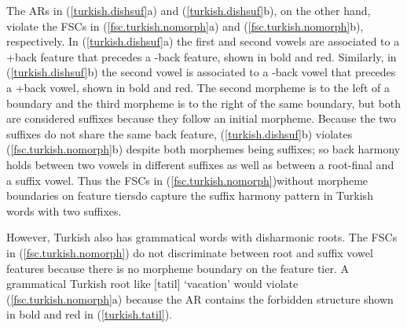 \documentclass[,doc,floatsintext]{apa6}
\theoremstyle{definition}
\theoremstyle{definition}
\theoremstyle{definition}
\theoremstyle{remark}
\begin{document}
The ARs in (\ref{turkish.dishsuf}a) and (\ref{turkish.dishsuf}b), on the
other hand, violate the FSCs in (\ref{fsc.turkish.nomorph}a) and
(\ref{fsc.turkish.nomorph}b), respectively. In (\ref{turkish.dishsuf}a)
the first and second vowels are associated to a +back feature that
precedes a -back feature, shown in bold and red. Similarly, in
(\ref{turkish.dishsuf}b) the second vowel is associated to a -back vowel
that precedes a +back vowel, shown in bold and red. The second morpheme
is to the left of a boundary and the third morpheme is to the right of
the same boundary, but both are considered suffixes because they follow
an initial morpheme. Because the two suffixes do not share the same back
feature, (\ref{turkish.dishsuf}b) violates (\ref{fsc.turkish.nomorph}b)
despite both morphemes being suffixes; so back harmony holds between two
vowels in different suffixes as well as between a root-final and a
suffix vowel. Thus the FSCs in
(\ref{fsc.turkish.nomorph})\textemdash without morpheme boundaries on
feature tiers\textemdash do capture the suffix harmony pattern in
Turkish words with two suffixes.

However, Turkish also has grammatical words with disharmonic roots. The
FSCs in (\ref{fsc.turkish.nomorph}) do not discriminate between root and
suffix vowel features because there is no morpheme boundary on the
feature tier. A grammatical Turkish root like {[}tatil{]} `vacation'
would violate (\ref{fsc.turkish.nomorph}a) because the AR contains the
forbidden structure shown in bold and red in (\ref{turkish.tatil}).

\begin{exe}
 \label{turkish.tatil} \\
\end{exe}
\end{document}
